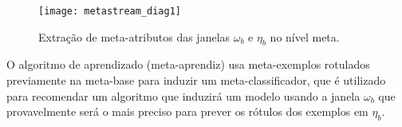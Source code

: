 \begin{figure}[ht]
    \centering
    \texttt{[image: metastream\_diag1]}
    \caption{Extração de meta-atributos das janelas  $\omega_b$ e $\eta_b$ no nível meta.}
    \label{fig:ms_diagram1}
\end{figure}

O algoritmo de aprendizado (meta-aprendiz) usa meta-exemplos rotulados
previamente na meta-base para induzir um meta-classificador, que é utilizado
para recomendar um algoritmo que induzirá um modelo usando a janela $\omega_b$
que provavelmente será o mais preciso para prever os rótulos dos exemplos em
$\eta_b$.







